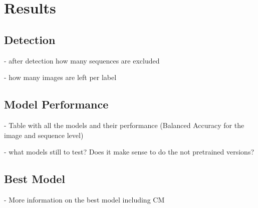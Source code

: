 

\section{Results}
\label{results}

    \subsection{Detection}

    - after detection how many sequences are excluded

    - how many images are left per label

    \subsection{Model Performance}

    - Table with all the models and their performance (Balanced Accuracy for the image and sequence level)

    - what models still to test? Does it make sense to do the not pretrained versions?

    \subsection{Best Model}

    - More information on the best model including CM